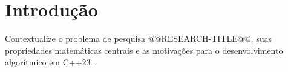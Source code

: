 \section{Introdução}\label{sec:introducao}

Contextualize o problema de pesquisa @@RESEARCH-TITLE@@, suas propriedades matemáticas centrais e as motivações para o desenvolvimento algorítmico em C++23~\cite{cormen2022introduction, korte2018combinatorial}.
